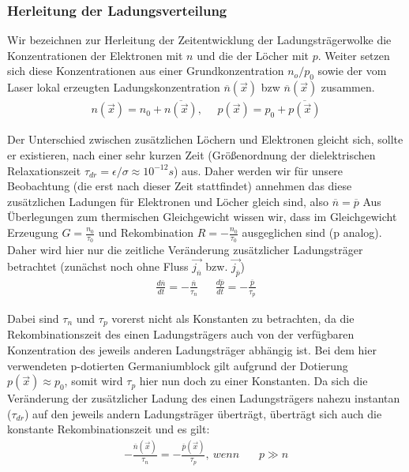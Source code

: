\documentclass[12pt]{article}
\begin{document}
\subsubsection{Herleitung der Ladungsverteilung}

Wir bezeichnen zur Herleitung der Zeitentwicklung der Ladungsträgerwolke die Konzentrationen der Elektronen mit $n$ und die der Löcher mit $p$. Weiter setzen sich diese Konzentrationen aus einer Grundkonzentration $n_o / p_0$ sowie der vom  Laser lokal erzeugten La\-dungs\-kon\-zen\-tra\-tion $\overline{n}(\vec{x})$ bzw $\overline{n}(\vec{x})$ zusammen.
\begin{align}
 n(\vec{x}) = n_0 + \overline{n(\vec{x})}, ~~~~~~p(\vec{x}) = p_0 + \overline{p(\vec{x})}
\end{align}

Der Unterschied zwischen zusätzlichen Löchern und Elektronen gleicht sich, sollte er existieren, nach einer sehr kurzen Zeit (Größenordnung der dielektrischen Relaxationszeit $\tau_{dr}=\epsilon/\sigma \approx 10^{-12}s$) aus. Daher werden wir für unsere Beobachtung (die erst nach dieser Zeit stattfindet) annehmen das diese zusätzlichen Ladungen für Elektronen und Löcher gleich sind, also $\overline{n}=\overline{p}$
Aus Überlegungen zum thermischen Gleichgewicht wissen wir, dass im Gleichgewicht Erzeugung $G=\frac{n_0}{\tau_0}$ und Rekombination $R=-\frac{n_0}{\tau_0}$ ausgeglichen sind (p analog). Daher wird hier nur die zeitliche Veränderung zusätzlicher Ladungsträger betrachtet (zunächst noch ohne Fluss $\vec{j_{\overline{n}}}$ bzw. $\vec{j_{\overline{p}}}$)
\begin{align}
 \frac{d\overline{n}}{dt}=-\frac{\overline{n}}{\tau_n}~~~~~~~ \frac{d\overline{p}}{dt}=-\frac{\overline{p}}{\tau_p}
\end{align}

Dabei sind $\tau_n$ und $\tau_p$ vorerst nicht als Konstanten zu betrachten, da die Rekombinationszeit des einen Ladungsträgers auch von der verfügbaren Konzentration des jeweils anderen Ladungsträger abhängig ist. Bei dem hier verwendeten p-dotierten Germaniumblock gilt aufgrund der Dotierung $p(\vec{x}) \approx p_0$, somit wird $\tau_p$ hier nun doch zu einer Konstanten. Da sich die Veränderung der zusätzlicher Ladung des einen Ladungsträgers nahezu instantan ($\tau_{dr}$) auf den jeweils andern Ladungsträger überträgt, überträgt sich auch die konstante Rekombinationszeit und es gilt:
\begin{align}
\label{rekombination}
 -\frac{\overline{n}(\vec{x})}{\tau_n}=-\frac{\overline{p}(\vec{x})}{\tau_p},~wenn~~~~~~~~p\gg n
\end{align}
\end{document}
